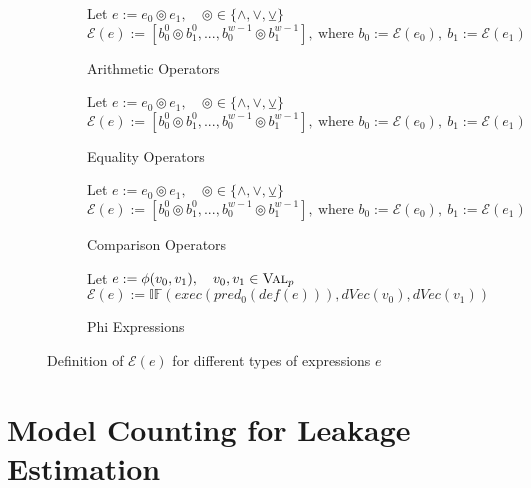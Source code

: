 \begin{figure}
\begin{subfigure}{1\textwidth}
    \end{subfigure}

    \begin{subfigure}{1\textwidth}
        \caption{Arithmetic Operators}
        Let $e := e_0 \circledcirc e_1, \quad \circledcirc \in \{ \land, \lor, \veebar \}$\\
        $\mathcal{E}(e) := [b_0^0 \circledcirc b_1^0, ... , b_0^{w-1} \circledcirc b_1^{w-1}], \: \text{where } b_0 := \mathcal{E}(e_0), \: b_1 := \mathcal{E}(e_1)$
        
    \end{subfigure}

    \begin{subfigure}{1\textwidth}
        \caption{Equality Operators}
        Let $e := e_0 \circledcirc e_1, \quad \circledcirc \in \{ \land, \lor, \veebar \}$\\
        $\mathcal{E}(e) := [b_0^0 \circledcirc b_1^0, ... , b_0^{w-1} \circledcirc b_1^{w-1}], \: \text{where } b_0 := \mathcal{E}(e_0), \: b_1 := \mathcal{E}(e_1)$
        
    \end{subfigure}

    \begin{subfigure}{1\textwidth}
        \caption{Comparison Operators}
        Let $e := e_0 \circledcirc e_1, \quad \circledcirc \in \{ \land, \lor, \veebar \}$\\
        $\mathcal{E}(e) := [b_0^0 \circledcirc b_1^0, ... , b_0^{w-1} \circledcirc b_1^{w-1}], \: \text{where } b_0 := \mathcal{E}(e_0), \: b_1 := \mathcal{E}(e_1)$
    \end{subfigure}

    \begin{subfigure}{1\textwidth}
        \caption{Phi Expressions}
        Let $e := \phi(v_0, v_1), \quad v_0, v_1 \in \textsc{Val}_p$\\
        $\mathcal{E}(e) := \mathbb{IF}(exec(pred_0(def(e))), dVec(v_0), dVec(v_1))$
    \end{subfigure}
    
    \caption{Definition of $\mathcal{E}(e)$ for different types of expressions $e$ }\label{fig:expr}
\end{figure}

\section{Model Counting for Leakage Estimation}


